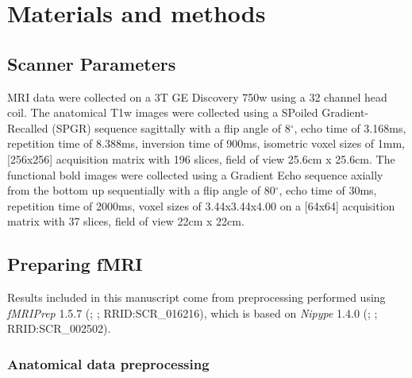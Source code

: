 \documentclass[10pt,letterpaper]{article}
\begin{document}
\section*{Materials and methods}
\label{methods}

\subsection*{Scanner Parameters}
\label{methods:scanner}

MRI data were collected on a 3T GE Discovery 750w using a 32 channel head coil.
The anatomical T1w images were collected using a SPoiled Gradient-Recalled (SPGR) sequence
sagittally with a flip angle of 8$^{\circ}$, echo time of 3.168ms,
repetition time of 8.388ms, inversion time of 900ms, isometric voxel sizes of 1mm,
[256x256] acquisition matrix with 196 slices, field of view 25.6cm x 25.6cm.
The functional bold images were collected using a Gradient Echo sequence axially from
the bottom up sequentially with a flip angle of 80$^{\circ}$, echo time of 30ms,
repetition time of 2000ms, voxel sizes of 3.44x3.44x4.00 on a [64x64] acquisition matrix
with 37 slices, field of view 22cm x 22cm.

\subsection*{Preparing fMRI}
\label{methods:fmriprep}

Results included in this manuscript come from preprocessing performed
using \emph{fMRIPrep} 1.5.7 (\cite{fmriprep1}; \cite{fmriprep2}; RRID:SCR\_016216),
which is based on \emph{Nipype} 1.4.0
(\cite{nipype1}; \cite{nipype2}; RRID:SCR\_002502).


\subsubsection*{Anatomical data preprocessing}
\label{methods:anat}
\end{document}
